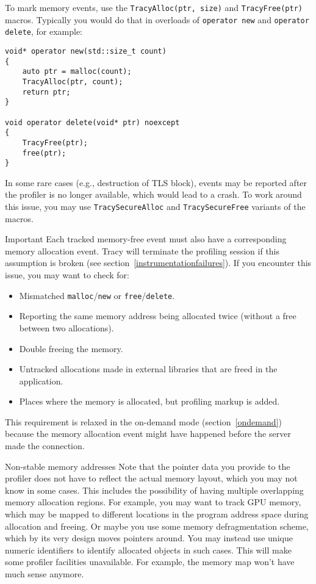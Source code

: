 \documentclass[hidelinks,titlepage,a4paper,twoside]{article}
\begin{document}
To mark memory events, use the \texttt{TracyAlloc(ptr, size)} and \texttt{TracyFree(ptr)} macros. Typically you would do that in overloads of \texttt{operator new} and \texttt{operator delete}, for example:

\begin{lstlisting}
void* operator new(std::size_t count)
{
    auto ptr = malloc(count);
    TracyAlloc(ptr, count);
    return ptr;
}

void operator delete(void* ptr) noexcept
{
    TracyFree(ptr);
    free(ptr);
}
\end{lstlisting}

In some rare cases (e.g., destruction of TLS block), events may be reported after the profiler is no longer available, which would lead to a crash. To work around this issue, you may use \texttt{TracySecureAlloc} and \texttt{TracySecureFree} variants of the macros.

\begin{bclogo}[
noborder=true,
couleur=black!5,
logo=\bcbombe
]{Important}
Each tracked memory-free event must also have a corresponding memory allocation event. Tracy will terminate the profiling session if this assumption is broken (see section~\ref{instrumentationfailures}). If you encounter this issue, you may want to check for:

\begin{itemize}
\item Mismatched \texttt{malloc}/\texttt{new} or \texttt{free}/\texttt{delete}.
\item Reporting the same memory address being allocated twice (without a free between two allocations).
\item Double freeing the memory.
\item Untracked allocations made in external libraries that are freed in the application.
\item Places where the memory is allocated, but profiling markup is added.
\end{itemize}

This requirement is relaxed in the on-demand mode (section~\ref{ondemand}) because the memory allocation event might have happened before the server made the connection.
\end{bclogo}

\begin{bclogo}[
noborder=true,
couleur=black!5,
logo=\bclampe
]{Non-stable memory addresses}
Note that the pointer data you provide to the profiler does not have to reflect the actual memory layout, which you may not know in some cases. This includes the possibility of having multiple overlapping memory allocation regions. For example, you may want to track GPU memory, which may be mapped to different locations in the program address space during allocation and freeing. Or maybe you use some memory defragmentation scheme, which by its very design moves pointers around. You may instead use unique numeric identifiers to identify allocated objects in such cases. This will make some profiler facilities unavailable. For example, the memory map won't have much sense anymore.
\end{bclogo}
\end{document}

